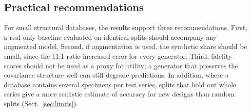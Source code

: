 \documentclass[pdflatex,sn-basic]{sn-jnl}
\begin{document}
\subsection{Practical recommendations}
For small structural databases, the results support three recommendations. First, a real-only baseline evaluated
on identical splits should accompany any augmented model. Second, if augmentation is used, the synthetic share
should be small, since the 11:1 ratio increased error for every generator. Third, fidelity scores should not be
used as a proxy for utility; a generator that preserves the covariance structure well can still degrade
predictions. In addition, where a database contains several specimens per test series, splits that hold out
whole series give a more realistic estimate of accuracy for new designs than random splits
(Sect.~\ref{sec:limits}).
\end{document}
